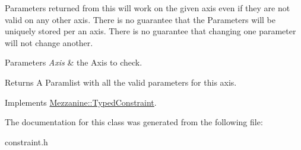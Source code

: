 Parameters returned from this will work on the given axis even if they are not valid on any other axis. There is no guarantee that the Parameters will be uniquely stored per an axis. There is no guarantee that changing one parameter will not change another. 
\begin{DoxyParams}{Parameters}
{\em Axis} & the Axis to check. \\
\hline
\end{DoxyParams}
\begin{DoxyReturn}{Returns}
A Paramlist with all the valid parameters for this axis. 
\end{DoxyReturn}
 

Implements \hyperlink{classMezzanine_1_1TypedConstraint_a3f895880ea78984a088996e1950fddcc}{Mezzanine::TypedConstraint}.



The documentation for this class was generated from the following file:\begin{DoxyCompactItemize}
\item 
constraint.h\end{DoxyCompactItemize}
